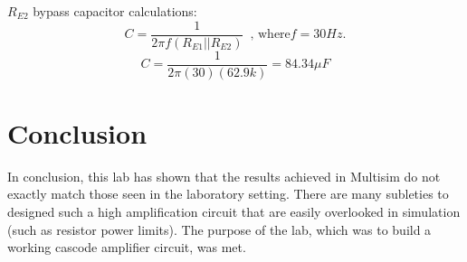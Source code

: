 \documentclass[12pt,letterpaper]{report}
\begin{document}
\noindent
$R_{E2}$ bypass capacitor calculations:
$$
C = \frac{1}{2\pi f (R_{E1}||R_{E2})}\, \text{ , where} f=30Hz.
$$
$$
C = \frac{1}{2 \pi (30)(62.9k)} = 84.34 \mu F
$$

\section*{Conclusion}

In conclusion, this lab has shown that the results achieved in Multisim do not exactly match those seen in the laboratory setting. There are many subleties to designed such a high amplification circuit that are easily overlooked in simulation (such as resistor power limits). The purpose of the lab, which was to build a working cascode amplifier circuit, was met.
\end{document}
